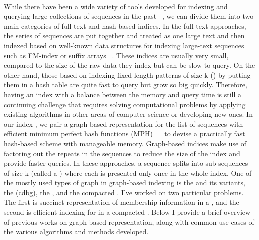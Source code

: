 \paragraph*{}

While there have been a wide variety of tools developed
for indexing and querying large collections of sequences in the past
~\citep{li2008mapping,langmead2009ultrafast,li2009fast,hach2010mrsfast,langmead2012fast,li2013aligning,liao2013subread,dobin2013star,kim2015hisat},
we can divide them into two main categories of full-text and hash-based indices.
In the full-text approaches, the series of sequences are put together and treated as one large text
and then indexed based on well-known data structures for indexing large-text sequences
such as FM-index or suffix arrays
~\citep{langmead2009ultrafast,li2009fast,langmead2012fast,li2013aligning,dobin2013star,kim2015hisat}.
These indices are usually very small, compared to the size of the
raw data they index but can be slow to query.
On the other hand, those based on indexing fixed-length patterns of size k (\kmers)
by putting them in a hash table
are quite fast to query but grow so big quickly.
Therefore, having an index with a balance between the memory and query time
is still a continuing challenge that requires solving computational problems by applying
existing algorithms in other areas of computer science or developing new ones.
In our index \pufferfish, we pair a graph-based representation for the list of sequences
with efficient minimum perfect hash functions (MPH)
~~\cite{limasset2017fast}
to devise a practically fast hash-based scheme with manageable memory.
Graph-based indices make use of factoring out the repeats in the sequences
to reduce the size of the index and provide faster queries.
In these approaches, a sequence
splits into sub-sequences of size k (called a \kmer) where each \kmer is presented only once
in the whole index.
One of the mostly used types of graph in graph-based indexing is the \dbg
and its variants, the \longcdbg (cdbg), the \compdbg, and the compacted \longcdbg.
I’ve worked on two particular problems. The first is succinct representation of membership information
in a \longcdbg, and the second is efficient indexing for \kmers
in a compacted \longcdbg.
Below I provide a brief overview of previous works on graph-based representation,
along with common use cases of the various algorithms and methods developed.

